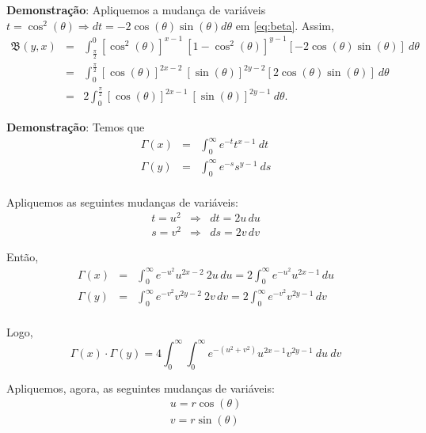 \textbf{Demonstração}: Apliquemos a mudança de variáveis \(t = \cos^2(\theta) \Rightarrow dt = -2\cos(\theta)\sin(\theta) d\theta\) em \eqref{eq:beta}. Assim,
\[\begin{array}{rcl}
\mathfrak{B}(y,x)
&=& \displaystyle\int_{\frac{\pi}{2}}^{0} [\cos^2(\theta)]^{x-1}\ [1-\cos^2(\theta)]^{y-1} [-2\cos(\theta)\sin(\theta)]\ d\theta \\
&=& \displaystyle\int_{0}^{\frac{\pi}{2}} [\cos(\theta)]^{2x-2}\ [\sin(\theta)]^{2y-2} [2\cos(\theta)\sin(\theta)]\ d\theta \\
&=& 2 \displaystyle\int_{0}^{\frac{\pi}{2}} [\cos(\theta)]^{2x-1}\ [\sin(\theta)]^{2y-1}\ d\theta.
\end{array}\]





\textbf{Demonstração}: Temos que
\[\begin{array}{rcl}
\Gamma(x) &=& \displaystyle\int_{0}^{\infty} e^{-t} t^{x-1}\ dt \\
\Gamma(y) &=& \displaystyle\int_{0}^{\infty} e^{-s} s^{y-1}\ ds \\
\end{array}\]


Apliquemos as seguintes mudanças de variáveis:
\[\begin{array}{rcl}
t = u^2 &\Rightarrow& dt = 2u\,du \\
s = v^2 &\Rightarrow& ds = 2v\,dv
\end{array}\]

Então,
\[\begin{array}{rcl}
\Gamma(x)
&=& \displaystyle\int_{0}^{\infty} e^{-u^2} u^{2x-2}\ 2u\,du
= 2 \int_{0}^{\infty} e^{-u^2} u^{2x-1}\,du \\
\Gamma(y)
&=& \displaystyle\int_{0}^{\infty} e^{-v^2} v^{2y-2}\ 2v\,dv
= 2 \int_{0}^{\infty} e^{-v^2} v^{2y-1}\,dv \\
\end{array}\]

Logo,
\[
\Gamma(x)\cdot\Gamma(y) = 4 \displaystyle\int_{0}^{\infty}\int_{0}^{\infty} e^{-(u^2+v^2)} u^{2x-1} v^{2y-1} \ du\ dv
\]

Apliquemos, agora, as seguintes mudanças de variáveis:
\[\begin{array}{rcl}
u = r\cos(\theta) \\
v = r \sin(\theta)
\end{array}\]

